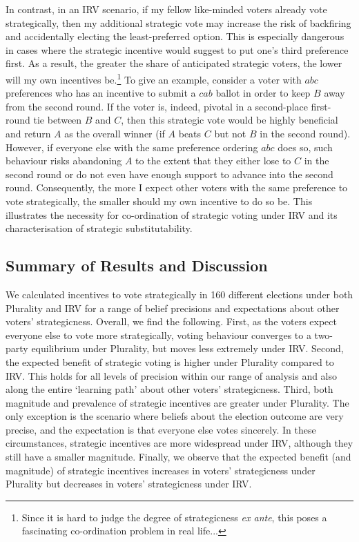 \documentclass[12pt, letter]{article}
\begin{document}
In contrast, in an IRV scenario, if my fellow like-minded voters already vote strategically, then my additional strategic vote may increase the risk of backfiring and accidentally electing the least-preferred option. This is especially dangerous in cases where the strategic incentive would suggest to put one's third preference first. As a result, the greater the share of anticipated strategic voters, the lower will my own incentives be.\footnote{Since it is hard to judge the degree of strategicness \emph{ex ante}, this poses a fascinating co-ordination problem in real life...} To give an example, consider a voter with $abc$ preferences who has an incentive to submit a $cab$ ballot in order to keep $B$ away from the second round. If the voter is, indeed, pivotal in a second-place first-round tie between $B$ and $C$, then this strategic vote would be highly beneficial and return $A$ as the overall winner (if $A$ beats $C$ but not $B$ in the second round). However, if everyone else with the same preference ordering $abc$ does so, such behaviour risks abandoning $A$ to the extent that they either lose to $C$ in the second round or do not even have enough support to advance into the second round. Consequently, the more I expect other voters with the same preference to vote strategically, the smaller should my own incentive to do so be. This illustrates the necessity for co-ordination of strategic voting under IRV and its characterisation of strategic substitutability.

\subsection{Summary of Results and Discussion}

We calculated incentives to vote strategically in 160 different elections under both Plurality and IRV for a range of belief precisions and expectations about other voters' strategicness. Overall, we find the following. First, as the voters expect everyone else to vote more strategically, voting behaviour converges to a two-party equilibrium under Plurality, but moves less extremely under IRV. Second, the expected benefit of strategic voting is higher under Plurality compared to IRV. This holds for all levels of precision within our range of analysis and also along the entire `learning path' about other voters' strategicness. Third, both magnitude and prevalence of strategic incentives are greater under Plurality. The only exception is the scenario where beliefs about the election outcome are very precise, and the expectation is that everyone else votes sincerely. In these circumstances, strategic incentives are more widespread under IRV, although they still have a smaller magnitude. Finally, we observe that the expected benefit (and magnitude) of strategic incentives increases in voters' strategicness under Plurality but decreases in voters' strategicness under IRV.
\end{document}
